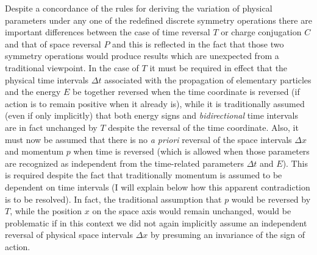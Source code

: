 \documentclass[notitlepage,12pt]{report}
\begin{document}
Despite a concordance of the rules for deriving the variation of physical parameters under any one of the redefined discrete symmetry operations there are important differences between the case of time reversal $T$ or charge conjugation $C$ and that of space reversal $P$ and this is reflected in the fact that those two symmetry operations would produce results which are unexpected from a traditional viewpoint. In the case of $T$ it must be required in effect that the physical time intervals $\Delta t$ associated with the propagation of elementary particles and the energy $E$ be together reversed when the time coordinate is reversed (if action is to remain positive when it already is), while it is traditionally assumed (even if only implicitly) that both energy signs and \textit{bidirectional} time intervals are in fact unchanged by $T$ despite the reversal of the time coordinate. Also, it must now be assumed that there is no \textit{a priori} reversal of the space intervals $\Delta x$ and momentum $p$ when time is reversed (which is allowed when those parameters are recognized as independent from the time-related parameters $\Delta t$ and $E$). This is required despite the fact that traditionally momentum is assumed to be dependent on time intervals (I will explain below how this apparent contradiction is to be resolved). In fact, the traditional assumption that $p$ would be reversed by $T$, while the position $x$ on the space axis would remain unchanged, would be problematic if in this context we did not again implicitly assume an independent reversal of physical space intervals $\Delta x$ by presuming an invariance of the sign of action.
\end{document}

